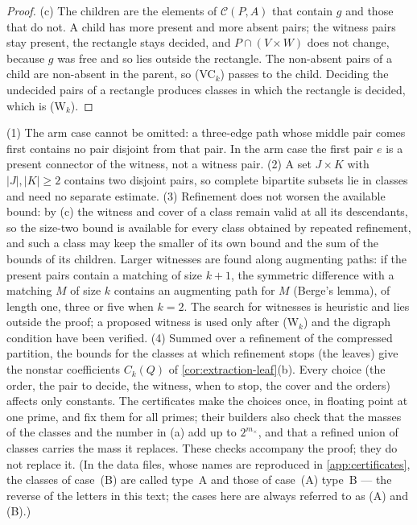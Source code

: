 \begin{proof}
(c) The children are the elements of $\mathcal C(P,A)$ that contain $g$ and those
that do not. A child has more present and more absent pairs; the witness pairs
stay present, the rectangle stays decided, and $P\cap(V\times W)$ does not change,
because $g$ was free and so lies outside the rectangle. The non-absent pairs of a
child are non-absent in the parent, so (VC$_k$) passes to the child. Deciding the
undecided pairs of a rectangle produces classes in which the rectangle is
decided, which is (W$_k$).
\end{proof}

\begin{remark}\label{rem:extraction-partition}
(1) The arm case cannot be omitted: a three-edge path whose middle pair comes
first contains no pair disjoint from that pair. In the arm case the first pair $e$
is a present connector of the witness, not a witness pair.
(2) A set $J\times K$ with $|J|,|K|\ge2$ contains two disjoint pairs, so complete
bipartite subsets lie in classes and need no separate estimate.
(3) Refinement does not worsen the available bound: by (c) the witness and cover of a class remain valid at
all its descendants, so the size-two bound is available for every class obtained by
repeated refinement, and such a class may keep the smaller of its own bound
and the sum of the bounds of its children.
Larger witnesses are found along augmenting paths: if the present pairs contain a
matching of size $k+1$, the symmetric difference with a matching $M$ of size $k$
contains an augmenting path for $M$ (Berge's lemma), of length one, three or five
when $k=2$. The search for witnesses is heuristic and lies outside the proof; a
proposed witness is used only after \textup{(W$_k$)} and the digraph
condition have been verified.
(4) Summed over a refinement of the compressed partition, the bounds for the
classes at which refinement stops (the leaves) give the
nonstar coefficients $C_k(Q)$ of \cref{cor:extraction-leaf}(b). Every choice (the
order, the pair to decide, the witness, when to stop, the cover and the orders)
affects only constants. The certificates make the choices once, in
floating point at one prime, and fix them for all primes; their builders also check
that the masses of the classes and the number in (a) add up to $2^{m_\times}$, and
that a refined union of classes carries the mass it replaces. These checks accompany
the proof; they do not replace it. (In the data files, whose
names are reproduced in \cref{app:certificates}, the classes of
case~(B) are called type~A and those of case~(A) type~B --- the
reverse of the letters in this text; the cases here are always
referred to as (A) and (B).)
\end{remark}

